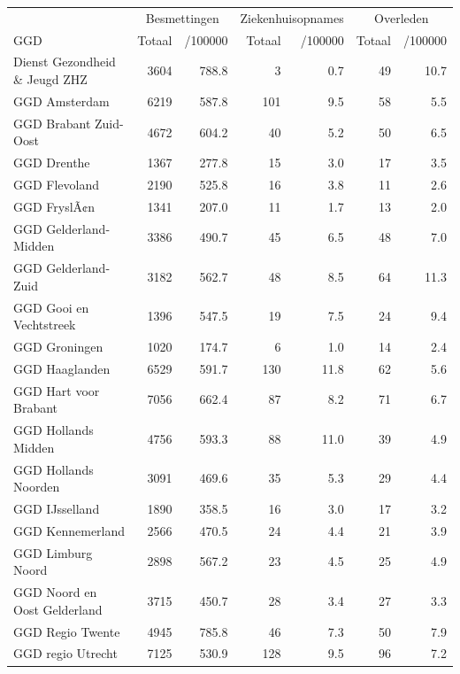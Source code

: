 \documentclass[
  english,
  man,floatsintext]{apa6}
\begin{document}
\begin{table}[H]
\centering\begingroup\fontsize{10}{12}\selectfont

\begin{threeparttable}
\begin{tabular}{lrrrrrr}
\toprule
\multicolumn{1}{c}{ } & \multicolumn{2}{c}{Besmettingen} & \multicolumn{2}{c}{Ziekenhuisopnames} & \multicolumn{2}{c}{Overleden} \\
\cmidrule(l{3pt}r{3pt}){2-3} \cmidrule(l{3pt}r{3pt}){4-5} \cmidrule(l{3pt}r{3pt}){6-7}
GGD & Totaal & /100000 & Totaal & /100000 & Totaal & /100000\\
\midrule
Dienst Gezondheid \& Jeugd ZHZ & 3604 & 788.8 & 3 & 0.7 & 49 & 10.7\\
GGD Amsterdam & 6219 & 587.8 & 101 & 9.5 & 58 & 5.5\\
GGD Brabant Zuid-Oost & 4672 & 604.2 & 40 & 5.2 & 50 & 6.5\\
GGD Drenthe & 1367 & 277.8 & 15 & 3.0 & 17 & 3.5\\
GGD Flevoland & 2190 & 525.8 & 16 & 3.8 & 11 & 2.6\\
GGD FryslÃ¢n & 1341 & 207.0 & 11 & 1.7 & 13 & 2.0\\
GGD Gelderland-Midden & 3386 & 490.7 & 45 & 6.5 & 48 & 7.0\\
GGD Gelderland-Zuid & 3182 & 562.7 & 48 & 8.5 & 64 & 11.3\\
GGD Gooi en Vechtstreek & 1396 & 547.5 & 19 & 7.5 & 24 & 9.4\\
GGD Groningen & 1020 & 174.7 & 6 & 1.0 & 14 & 2.4\\
GGD Haaglanden & 6529 & 591.7 & 130 & 11.8 & 62 & 5.6\\
GGD Hart voor Brabant & 7056 & 662.4 & 87 & 8.2 & 71 & 6.7\\
GGD Hollands Midden & 4756 & 593.3 & 88 & 11.0 & 39 & 4.9\\
GGD Hollands Noorden & 3091 & 469.6 & 35 & 5.3 & 29 & 4.4\\
GGD IJsselland & 1890 & 358.5 & 16 & 3.0 & 17 & 3.2\\
GGD Kennemerland & 2566 & 470.5 & 24 & 4.4 & 21 & 3.9\\
GGD Limburg Noord & 2898 & 567.2 & 23 & 4.5 & 25 & 4.9\\
GGD Noord en Oost Gelderland & 3715 & 450.7 & 28 & 3.4 & 27 & 3.3\\
GGD Regio Twente & 4945 & 785.8 & 46 & 7.3 & 50 & 7.9\\
GGD regio Utrecht & 7125 & 530.9 & 128 & 9.5 & 96 & 7.2\\

\end{tabular}
\end{threeparttable}
\end{table}
\end{document}
